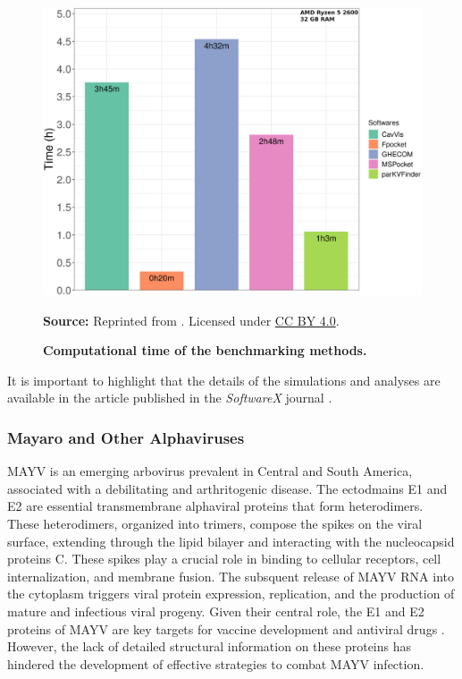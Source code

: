 \documentclass[Ingles]{phdthesis}
\begin{document}
\begin{figure}[H]
  \centerline{\includegraphics[scale=0.9]{images/hiv1-protease-dm-times.png}}
  \centerline{\tiny{\textbf{Source:} Reprinted from \cite{guerra2020}. Licensed under \href{https://creativecommons.org/licenses/by/4.0/}{CC BY 4.0}.}}
  \caption[Computational time of the benchmarking methods]{\textbf{Computational time of the benchmarking methods.}}
  \label{fig:hiv1-protease-dm-times}
\end{figure}

It is important to highlight that the details of the simulations and analyses are available in the article published in the \textit{SoftwareX} journal \cite{guerra2020}.

\subsubsection{Mayaro and Other Alphaviruses \label{sec:parkvfinder-mayaro}}

\ac{MAYV} is an emerging arbovirus prevalent in Central and South America, associated with a debilitating and arthritogenic disease. The ectodmains E1 and E2 are essential transmembrane alphaviral proteins that form heterodimers. These heterodimers, organized into trimers, compose the spikes on the viral surface, extending through the lipid bilayer and interacting with the nucleocapsid proteins C. These spikes play a crucial role in binding to cellular receptors, cell internalization, and membrane fusion. The subsquent release of \acs{MAYV} RNA into the cytoplasm triggers viral protein expression, replication, and the production of mature and infectious viral progeny. Given their central role, the E1 and E2 proteins of \acs{MAYV} are key targets for vaccine development and antiviral drugs \cite{ribeiro2021}. However, the lack of detailed structural information on these proteins has hindered the development of effective strategies to combat \acs{MAYV} infection.
\end{document}
